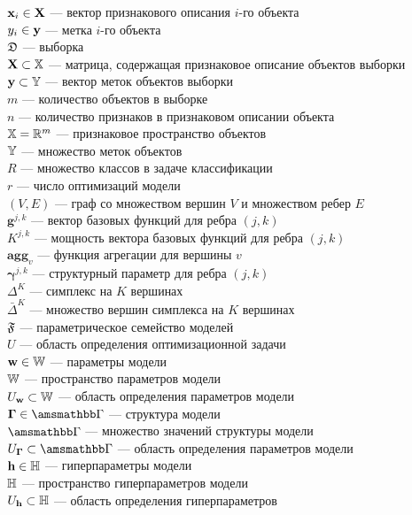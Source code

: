 \noindent$\mathbf{x}_i \in \mathbf{X}$ --- вектор признакового описания $i$-го объекта\\
$y_i \in \mathbf{y}$ --- метка $i$-го объекта\\
$\mathfrak{D}$ --- выборка\\
$\mathbf{X} \subset \mathbb{X}$ --- матрица, содержащая признаковое описание объектов выборки\\
$\mathbf{y} \subset \mathbb{Y}$ --- вектор меток объектов выборки\\
$m$ --- количество объектов в выборке\\
$n$ --- количество признаков в признаковом описании объекта\\
$\mathbb{X} = \mathbb{R}^m$ --- признаковое пространство объектов\\
$\mathbb{Y}$ --- множество меток объектов\\
$R$ --- множество классов в задаче классификации\\
$r$ --- число оптимизаций модели\\
$(V,E)$ --- граф со множеством вершин $V$ и множеством ребер $E$\\
$\mathbf{g}^{j,k}$ --- вектор базовых функций для ребра $(j,k)$\\
$K^{j,k}$ --- мощность вектора базовых функций для ребра $(j,k)$\\
$\textbf{agg}_v$ --- функция агрегации для вершины $v$ \\
$\boldsymbol{\gamma}^{j,k}$ --- структурный параметр для ребра $(j,k)$\\
$\Delta^{K}$ --- симплекс на $K$ вершинах\\
$\bar{\Delta}^{K}$ --- множество вершин симплекса на $K$ вершинах\\
$\mathfrak{F}$ --- параметрическое семейство моделей\\
$U$ --- область определения оптимизационной задачи\\
$\mathbf{w} \in \mathbb{W}$ --- параметры модели\\
$\mathbb{W}$ --- пространство параметров модели\\
$U_\mathbf{w} \subset \mathbb{W}$ --- область определения параметров модели\\
$\G \in \Gb$ --- структура модели\\
$\Gb$ --- множество значений структуры модели\\
$\UG \subset \Gb$ --- область определения параметров модели\\
$\mathbf{h} \in \mathbb{H}$ --- гиперпараметры модели\\
$\mathbb{H}$ --- пространство гиперпараметров модели\\
$U_{\mathbf{h}} \subset \mathbb{H}$ --- область определения гиперпараметров\\
